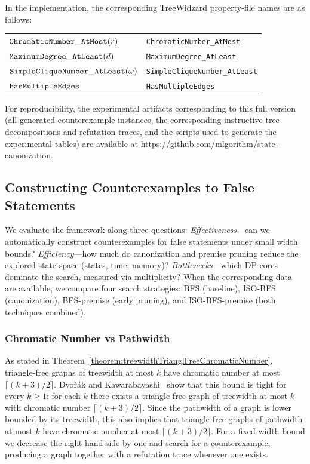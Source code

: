 \documentclass[11pt,a4paper]{article}
\newcommand{\dpNamePart}[1]{\mbox{\normalfont\ttfamily #1}}
\newcommand{\hasMultiEdgeCore}{\dpNamePart{HasMultipleEdges}}
\newcommand{\simpleCliqueNumberAtLeastCore}[1]{\dpNamePart{SimpleCliqueNumber}\_\allowbreak\dpNamePart{AtLeast}(#1)}
\newcommand{\maxDegreeAtLeastCore}[1]{\dpNamePart{MaximumDegree}\_\allowbreak\dpNamePart{AtLeast}(#1)}
\newcommand{\numbercolors}{r}
\newcommand{\chromaticnumberAtMostCore}[1]{\dpNamePart{ChromaticNumber}\_\allowbreak\dpNamePart{AtMost}(#1)}
\begin{document}
In the implementation, the corresponding TreeWidzard property-file names are as follows:
\begin{center}
\begin{tabular}{ll}
$\chromaticnumberAtMostCore{\numbercolors}$ & \texttt{ChromaticNumber\_AtMost}\\
$\maxDegreeAtLeastCore{d}$ & \texttt{MaximumDegree\_AtLeast}\\
$\simpleCliqueNumberAtLeastCore{\omega}$ & \texttt{SimpleCliqueNumber\_AtLeast}\\
$\hasMultiEdgeCore$ & \texttt{HasMultipleEdges}
\end{tabular}
\end{center}

For reproducibility, the experimental artifacts corresponding to this full version (all generated counterexample instances, the corresponding instructive tree decompositions and refutation traces, and the scripts used to generate the experimental tables) are available at \url{https://github.com/mlgorithm/state-canonization}.

\subsection{Constructing Counterexamples to False Statements}
We evaluate the framework along three questions: \emph{Effectiveness}---can we automatically construct counterexamples for false statements under small width bounds? \emph{Efficiency}---how much do canonization and premise pruning reduce the explored state space (states, time, memory)? \emph{Bottlenecks}---which DP-cores dominate the search, measured via multiplicity? When the corresponding data are available, we compare four search strategies: BFS (baseline), ISO-BFS (canonization), BFS-premise (early pruning), and ISO-BFS-premise (both techniques combined).


\subsubsection{Chromatic Number vs Pathwidth}

As stated in Theorem~\ref{theorem:treewidthTrianglFreeChromaticNumber}, triangle-free graphs of treewidth at most $k$ have chromatic number at
most $\lceil (k+3)/2 \rceil$. Dvo{\v{r}}\'{a}k and Kawarabayashi~\cite{dvovrak2017triangle} show that this
bound is tight for every $k \ge 1$: for each $k$ there exists a triangle-free graph of treewidth at
most $k$ with chromatic number $\lceil (k+3)/2 \rceil$. Since the pathwidth of a graph is lower
bounded by its treewidth, this also implies that triangle-free graphs of pathwidth at most $k$
have chromatic number at most $\lceil (k+3)/2 \rceil$. For a fixed width bound we decrease the
right-hand side by one and search for a counterexample, producing a graph together with a
refutation trace whenever one exists.
\end{document}
